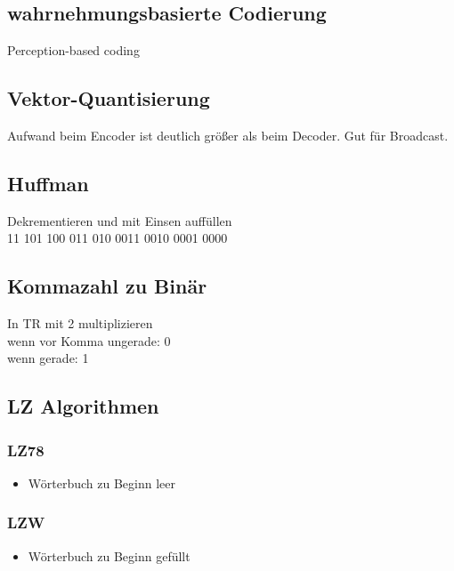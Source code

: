 \begin{multicols}{2}
\subsection*{wahrnehmungsbasierte Codierung}
Perception-based coding

\subsection*{Vektor-Quantisierung}
Aufwand beim Encoder ist deutlich größer als beim Decoder. Gut für Broadcast.

\subsection*{Huffman}
Dekrementieren und mit Einsen auffüllen\\
11 101 100 011 010 0011 0010 0001 0000

\subsection*{Kommazahl zu Binär}
\begin{minipage}{\columnwidth}
In TR mit 2 multiplizieren\\
wenn vor Komma ungerade: 0\\
wenn gerade: 1
\end{minipage}

\subsection*{LZ Algorithmen}
\begin{minipage}{\columnwidth}
\subsubsection*{LZ78}
\begin{itemize}
	\setlength{\parskip}{0pt}
	\setlength{\itemsep}{0pt plus 1pt}
	\item Wörterbuch zu Beginn leer
\end{itemize}
\subsubsection*{LZW}
\begin{itemize}
	\setlength{\parskip}{0pt}
	\setlength{\itemsep}{0pt plus 1pt}
	\item Wörterbuch zu Beginn gefüllt
\end{itemize}
\end{minipage}

\end{multicols}